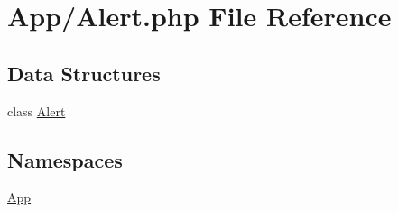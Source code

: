 \hypertarget{_alert_8php}{}\section{App/\+Alert.php File Reference}
\label{_alert_8php}
\subsection*{Data Structures}
\begin{DoxyCompactItemize}
\item 
class \hyperlink{class_app_1_1_alert}{Alert}
\end{DoxyCompactItemize}
\subsection*{Namespaces}
\begin{DoxyCompactItemize}
\item 
 \hyperlink{namespace_app}{App}
\end{DoxyCompactItemize}
